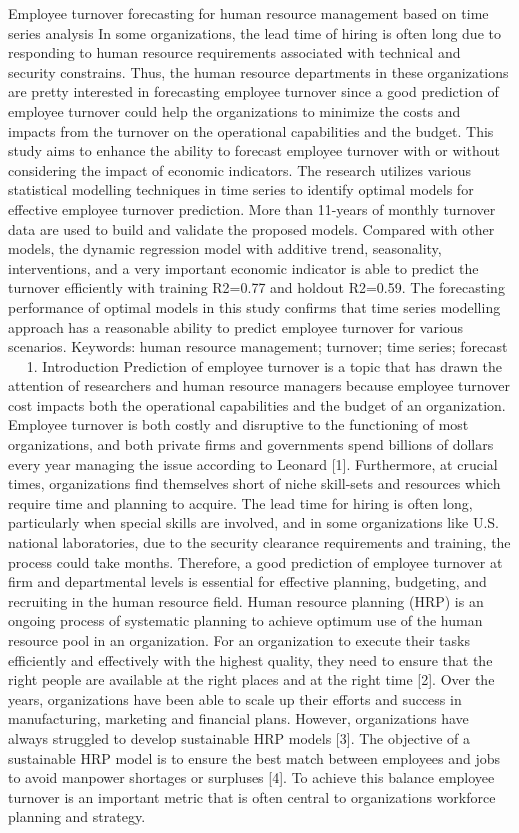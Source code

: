 Employee turnover forecasting for human resource management 
based on time series analysis
In some organizations, the lead time of hiring is often long due to responding to human resource requirements associated with technical and security constrains. Thus, the human resource departments in these organizations are pretty interested in forecasting employee turnover since a good prediction of employee turnover could help the organizations to minimize the costs and impacts from the turnover on the operational capabilities and the budget. This study aims to enhance the ability to forecast employee turnover with or without considering the impact of economic indicators. The research utilizes various statistical modelling techniques in time series to identify optimal models for effective employee turnover prediction. More than 11-years of monthly turnover data are used to build and validate the proposed models. Compared with other models, the dynamic regression model with additive trend, seasonality, interventions, and a very important economic indicator is able to predict the turnover efficiently with training R2=0.77 and holdout R2=0.59. The forecasting performance of optimal models in this study confirms that time series modelling approach has a reasonable ability to predict employee turnover for various scenarios.
Keywords: human resource management; turnover; time series; forecast
 
1.    Introduction
Prediction of employee turnover is a topic that has drawn the attention of researchers and human resource managers because employee turnover cost impacts both the operational capabilities and the budget of an organization. Employee turnover is both costly and disruptive to the functioning of most organizations, and both private firms and governments spend billions of dollars every year managing the issue according to Leonard [1]. Furthermore, at crucial times, organizations find themselves short of niche skill-sets and resources which require time and planning to acquire. The lead time for hiring is often long, particularly when special skills are involved, and in some organizations like U.S. national laboratories, due to the security clearance requirements and training, the process could take months. Therefore, a good prediction of employee turnover at firm and departmental levels is essential for effective planning, budgeting, and recruiting in the human resource field. 
Human resource planning (HRP) is an ongoing process of systematic planning to achieve optimum use of the human resource pool in an organization. For an organization to execute their tasks efficiently and effectively with the highest quality, they need to ensure that the right people are available at the right places and at the right time [2]. Over the years, organizations have been able to scale up their efforts and success in manufacturing, marketing and financial plans. However, organizations have always struggled to develop sustainable HRP models [3]. The objective of a sustainable HRP model is to ensure the best match between employees and jobs to avoid manpower shortages or surpluses [4]. To achieve this balance employee turnover is an important metric that is often central to organizations workforce planning and strategy.
